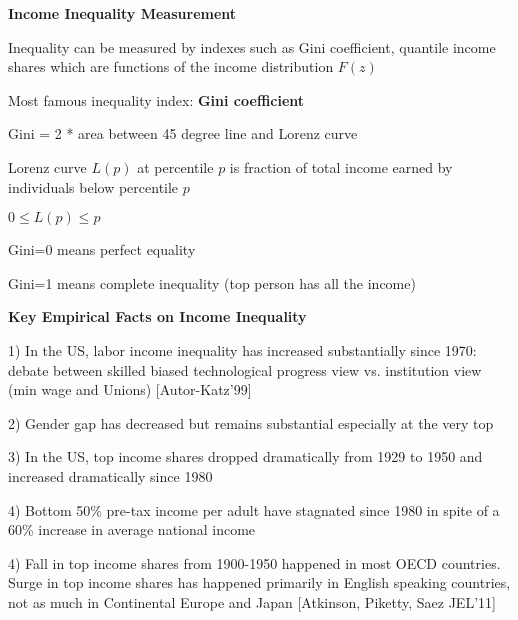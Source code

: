 \documentclass[landscape]{slides}
\begin{document}
\begin{slide}

\end{slide}



\begin{slide}
\begin{center}
{\bf Income Inequality Measurement}
\end{center}
Inequality can be measured by indexes such as Gini coefficient, 
quantile income shares which are functions of the income
distribution $F(z)$

Most famous inequality index: \textbf{Gini coefficient}

Gini = 2 * area between 45 degree line and Lorenz curve

Lorenz curve $L(p)$ at percentile $p$ is fraction of total income
earned by individuals below percentile $p$

$0 \leq L(p) \leq p$

Gini=0 means perfect equality

Gini=1 means complete inequality (top person has all the income)


\end{slide}

\begin{slide}

\end{slide}


\begin{slide}
\begin{center}
{\bf Key Empirical Facts on Income Inequality}
\end{center}
1) In the US, labor income inequality has increased substantially
since 1970: debate between skilled biased technological progress
view vs. institution view (min wage and Unions) [Autor-Katz'99]

2) Gender gap has decreased but remains substantial especially at the very top

3) In the US, top income shares dropped dramatically from 1929 to
1950 and increased dramatically since 1980 

4) Bottom 50\% pre-tax income per adult have stagnated since 1980
in spite of a 60\% increase in average national income 


4) Fall in top income shares from 1900-1950 happened in most
OECD countries. Surge in top income shares has happened primarily
in English speaking countries, not as much in Continental Europe
and Japan [Atkinson, Piketty, Saez JEL'11]

\end{slide}
\end{document}
